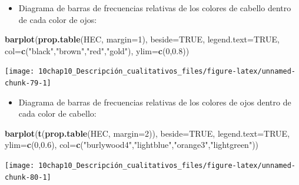 \documentclass[
]{book}
\newenvironment{Shaded}{\begin{snugshade}}{\end{snugshade}}
\newcommand{\DataTypeTok}[1]{\textcolor[rgb]{0.13,0.29,0.53}{#1}}
\newcommand{\DecValTok}[1]{\textcolor[rgb]{0.00,0.00,0.81}{#1}}
\newcommand{\FloatTok}[1]{\textcolor[rgb]{0.00,0.00,0.81}{#1}}
\newcommand{\KeywordTok}[1]{\textcolor[rgb]{0.13,0.29,0.53}{\textbf{#1}}}
\newcommand{\NormalTok}[1]{#1}
\newcommand{\OtherTok}[1]{\textcolor[rgb]{0.56,0.35,0.01}{#1}}
\newcommand{\StringTok}[1]{\textcolor[rgb]{0.31,0.60,0.02}{#1}}
\providecommand{\tightlist}{%
  \setlength{\itemsep}{0pt}\setlength{\parskip}{0pt}}
\theoremstyle{definition}
\theoremstyle{definition}
\theoremstyle{definition}
\theoremstyle{remark}
\begin{document}
\begin{itemize}
\tightlist
\item
  Diagrama de barras de frecuencias relativas de los colores de cabello dentro de cada color de ojos:
\end{itemize}

\begin{Shaded}
\begin{Highlighting}[]
\KeywordTok{barplot}\NormalTok{(}\KeywordTok{prop.table}\NormalTok{(HEC, }\DataTypeTok{margin=}\DecValTok{1}\NormalTok{), }\DataTypeTok{beside=}\OtherTok{TRUE}\NormalTok{, }\DataTypeTok{legend.text=}\OtherTok{TRUE}\NormalTok{,}
   \DataTypeTok{col=}\KeywordTok{c}\NormalTok{(}\StringTok{"black"}\NormalTok{,}\StringTok{"brown"}\NormalTok{,}\StringTok{"red"}\NormalTok{,}\StringTok{"gold"}\NormalTok{), }\DataTypeTok{ylim=}\KeywordTok{c}\NormalTok{(}\DecValTok{0}\NormalTok{,}\FloatTok{0.8}\NormalTok{))}
\end{Highlighting}
\end{Shaded}

\begin{center}\texttt{[image: 10chap10\_Descripción\_cualitativos\_files/figure-latex/unnamed-chunk-79-1]} \end{center}

\begin{itemize}
\tightlist
\item
  Diagrama de barras de frecuencias relativas de los colores de ojos dentro de cada color de cabello:
\end{itemize}

\begin{Shaded}
\begin{Highlighting}[]
\KeywordTok{barplot}\NormalTok{(}\KeywordTok{t}\NormalTok{(}\KeywordTok{prop.table}\NormalTok{(HEC, }\DataTypeTok{margin=}\DecValTok{2}\NormalTok{)), }\DataTypeTok{beside=}\OtherTok{TRUE}\NormalTok{,}
   \DataTypeTok{legend.text=}\OtherTok{TRUE}\NormalTok{, }\DataTypeTok{ylim=}\KeywordTok{c}\NormalTok{(}\DecValTok{0}\NormalTok{,}\FloatTok{0.6}\NormalTok{),}
   \DataTypeTok{col=}\KeywordTok{c}\NormalTok{(}\StringTok{"burlywood4"}\NormalTok{,}\StringTok{"lightblue"}\NormalTok{,}\StringTok{"orange3"}\NormalTok{,}\StringTok{"lightgreen"}\NormalTok{))}
\end{Highlighting}
\end{Shaded}

\begin{center}\texttt{[image: 10chap10\_Descripción\_cualitativos\_files/figure-latex/unnamed-chunk-80-1]} \end{center}
\end{document}
